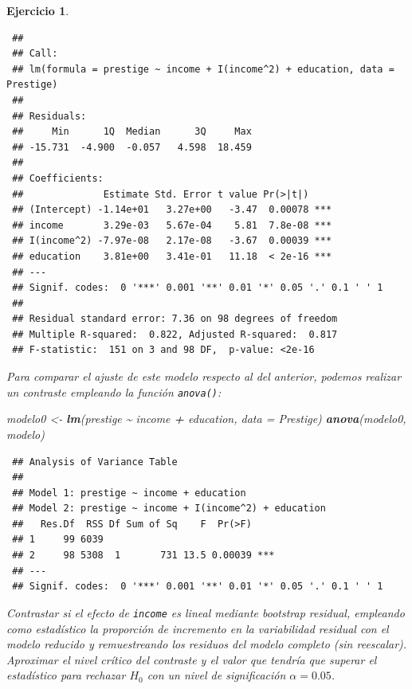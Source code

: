 \documentclass[
  spanish,
  10pt,
]{book}
\newenvironment{Shaded}{\begin{snugshade}}{\end{snugshade}}
\newcommand{\AttributeTok}[1]{\textcolor[rgb]{0.13,0.29,0.53}{#1}}
\newcommand{\FunctionTok}[1]{\textcolor[rgb]{0.13,0.29,0.53}{\textbf{#1}}}
\newcommand{\NormalTok}[1]{#1}
\newcommand{\OtherTok}[1]{\textcolor[rgb]{0.56,0.35,0.01}{#1}}
\newcommand{\SpecialCharTok}[1]{\textcolor[rgb]{0.81,0.36,0.00}{\textbf{#1}}}
\theoremstyle{break}
\newtheorem{exercise}{Ejercicio}[chapter]
\theoremstyle{nonumberplain}
\begin{document}
\begin{exercise}
\begin{verbatim}
 ## 
 ## Call:
 ## lm(formula = prestige ~ income + I(income^2) + education, data = Prestige)
 ## 
 ## Residuals:
 ##     Min      1Q  Median      3Q     Max 
 ## -15.731  -4.900  -0.057   4.598  18.459 
 ## 
 ## Coefficients:
 ##              Estimate Std. Error t value Pr(>|t|)    
 ## (Intercept) -1.14e+01   3.27e+00   -3.47  0.00078 ***
 ## income       3.29e-03   5.67e-04    5.81  7.8e-08 ***
 ## I(income^2) -7.97e-08   2.17e-08   -3.67  0.00039 ***
 ## education    3.81e+00   3.41e-01   11.18  < 2e-16 ***
 ## ---
 ## Signif. codes:  0 '***' 0.001 '**' 0.01 '*' 0.05 '.' 0.1 ' ' 1
 ## 
 ## Residual standard error: 7.36 on 98 degrees of freedom
 ## Multiple R-squared:  0.822, Adjusted R-squared:  0.817 
 ## F-statistic:  151 on 3 and 98 DF,  p-value: <2e-16
\end{verbatim}

Para comparar el ajuste de este modelo respecto al del anterior, podemos
realizar un contraste empleando la función \texttt{anova()}:

\begin{Shaded}
\begin{Highlighting}[]
\NormalTok{modelo0 }\OtherTok{\textless{}{-}} \FunctionTok{lm}\NormalTok{(prestige }\SpecialCharTok{\textasciitilde{}}\NormalTok{ income }\SpecialCharTok{+}\NormalTok{ education, }\AttributeTok{data =}\NormalTok{ Prestige)}
\FunctionTok{anova}\NormalTok{(modelo0, modelo)}
\end{Highlighting}
\end{Shaded}

\begin{verbatim}
 ## Analysis of Variance Table
 ## 
 ## Model 1: prestige ~ income + education
 ## Model 2: prestige ~ income + I(income^2) + education
 ##   Res.Df  RSS Df Sum of Sq    F  Pr(>F)    
 ## 1     99 6039                              
 ## 2     98 5308  1       731 13.5 0.00039 ***
 ## ---
 ## Signif. codes:  0 '***' 0.001 '**' 0.01 '*' 0.05 '.' 0.1 ' ' 1
\end{verbatim}

Contrastar si el efecto de \texttt{income} es lineal mediante bootstrap residual,
empleando como estadístico la proporción de incremento en la variabilidad residual con el
modelo reducido y remuestreando los residuos del modelo completo (sin reescalar).
Aproximar el nivel crítico del contraste y el valor que tendría que superar el
estadístico para rechazar \(H_0\) con un nivel de significación \(\alpha = 0.05\).
\end{exercise}
\end{document}
